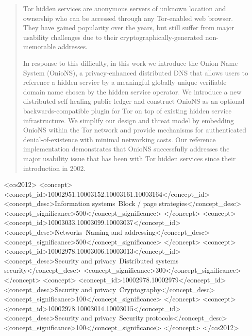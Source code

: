 \documentclass{sig-alternate}
\begin{document}
\begin{abstract}

Tor hidden services are anonymous servers of unknown location and ownership who can be accessed through any Tor-enabled web browser. They have gained popularity over the years, but still suffer from major usability challenges due to their cryptographically-generated non-memorable addresses.

In response to this difficulty, in this work we introduce the Onion Name System (OnioNS), a privacy-enhanced distributed DNS that allows users to reference a hidden service by a meaningful globally-unique verifiable domain name chosen by the hidden service operator. We introduce a new distributed self-healing public ledger and construct OnioNS as an optional backwards-compatible plugin for Tor on top of existing hidden service infrastructure. We simplify our design and threat model by embedding OnioNS within the Tor network and provide mechanisms for authenticated denial-of-existence with minimal networking costs. Our reference implementation demonstrates that OnioNS successfully addresses the major usability issue that has been with Tor hidden services since their introduction in 2002.

\end{abstract}

\begin{CCSXML}
<ccs2012>
<concept>
<concept_id>10002951.10003152.10003161.10003164</concept_id>
<concept_desc>Information systems~Block / page strategies</concept_desc>
<concept_significance>500</concept_significance>
</concept>
<concept>
<concept_id>10003033.10003099.10003037</concept_id>
<concept_desc>Networks~Naming and addressing</concept_desc>
<concept_significance>500</concept_significance>
</concept>
<concept>
<concept_id>10002978.10003006.10003013</concept_id>
<concept_desc>Security and privacy~Distributed systems security</concept_desc>
<concept_significance>300</concept_significance>
</concept>
<concept>
<concept_id>10002978.10002979</concept_id>
<concept_desc>Security and privacy~Cryptography</concept_desc>
<concept_significance>100</concept_significance>
</concept>
<concept>
<concept_id>10002978.10003014.10003015</concept_id>
<concept_desc>Security and privacy~Security protocols</concept_desc>
<concept_significance>100</concept_significance>
</concept>
</ccs2012>
\end{CCSXML}
\end{document}
